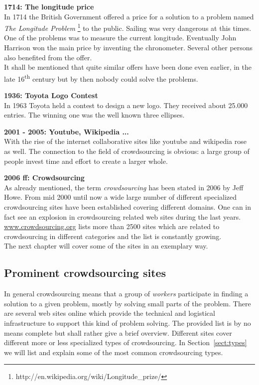 \documentclass{acm_proc_article-sp}
\begin{document}
  \textbf{1714: The longitude price}\\
  In 1714 the British Government offered a price for a solution to a problem named \textit{The Longitude Problem} \footnote{http://en.wikipedia.org/wiki/Longitude\_prize/} to the public. Sailing was very dangerous at this times. One of the problems was to measure the current longitude. Eventually John Harrison won the main price by inventing the chronometer. Several other persons also benefited from the offer.\\
  It shall be mentioned that quite similar offers have been done even earlier, in the late 16\textsuperscript{th} century but by then nobody could solve the problems.

  \textbf{1936: Toyota Logo Contest}\\
  In 1963 Toyota held a contest to design a new logo. They received about 25.000 entries. The winning one was the well known three ellipses.

  \textbf{2001 - 2005: Youtube, Wikipedia ...}\\
  With the rise of the internet collaborative sites like youtube and wikipedia rose as well. The connection to the field of crowdsourcing is obvious: a large group of people invest time and effort to create a larger whole.

  \textbf{2006 ff: Crowdsourcing}\\
  As already mentioned, the term \textit{crowdsourcing} has been stated in 2006 by Jeff Howe. From mid 2000 until now a wide large number of different specialized crowdsourcing sites have been established covering different domains. One can in fact see an explosion in crowdsourcing related web sites during the last years. \href{http://www.crowdsourcing.org/directory}{www.crowdsourcing.org} lists more than 2500 sites which are related to crowdsourcing in different categories and the list is constantly growing.\\
  The next chapter will cover some of the sites in an exemplary way.

  \subsection{Prominent crowdsourcing sites}
  In general crowdsourcing means that a group of \textit{workers} participate in finding a solution to a given problem, mostly by solving small parts of the problem. There are several web sites online which provide the technical and logistical infrastructure to support this kind of problem solving. The provided list is by no means complete but shall rather give a brief overview. Different sites cover different more or less specialized types of crowdsourcing. In Section~\ref{sect:types} we will list and explain some of the most common crowdsourcing types.
\end{document}
